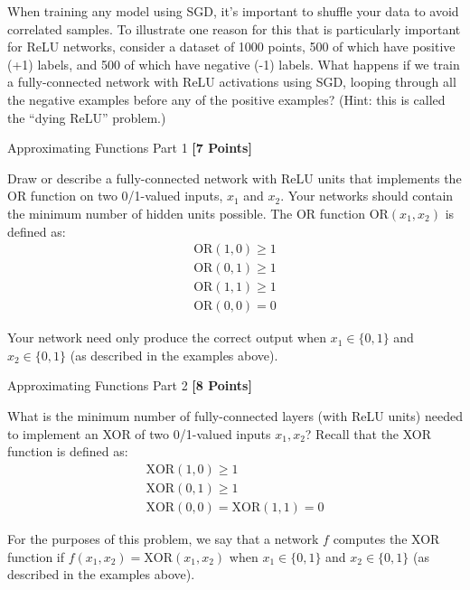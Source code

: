 When training any model using SGD, it's important to shuffle your data to avoid correlated samples. To illustrate one reason for this that is particularly important for ReLU networks, consider a dataset of 1000 points, 500 of which have positive (+1) labels, and 500 of which have negative (-1) labels. What happens if we train a fully-connected network with ReLU activations using SGD, looping through all the negative examples before any of the positive examples? (Hint: this is called the ``dying ReLU'' problem.)

\begin{solution}

\end{solution}



\problem Approximating Functions Part 1 \textbf{[7 Points]}

Draw or describe a fully-connected network with ReLU units that implements the OR function on two 0/1-valued inputs,  $x_1$ and $x_2$.  Your networks should contain the minimum number of hidden units possible.  The OR function $\text{OR}(x_1, x_2)$ is defined as:
\begin{gather*}
\text{OR}(1, 0) \geq 1 \\
\text{OR}(0, 1) \geq 1 \\
\text{OR}(1, 1) \geq 1 \\
\text{OR}(0, 0) = 0
\end{gather*}

Your network need only produce the correct output when $x_1 \in \{0, 1\}$ and $x_2 \in \{0, 1\}$ (as described in the examples above).

\begin{subsolution}


\end{subsolution}

\problem Approximating Functions Part 2 \textbf{[8 Points]}

What is the minimum number of fully-connected layers (with ReLU units) needed to implement an XOR of two 0/1-valued inputs $x_1, x_2$? Recall that the XOR function is defined as:
\begin{gather*}
\text{XOR}(1, 0) \geq 1 \\
\text{XOR}(0, 1) \geq 1 \\
\text{XOR}(0, 0) = \text{XOR}(1, 1) = 0
\end{gather*}

For the purposes of this problem, we say that a network $f$ computes the XOR function if $f(x_1, x_2) = \text{XOR}(x_1, x_2)$ when $x_1 \in \{0, 1\}$ and $x_2 \in \{0, 1\}$ (as described in the examples above).

